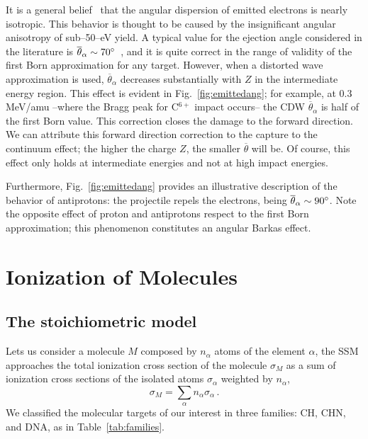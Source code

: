 \documentclass[10pt,showpacs,twocolumn]{revtex4}
\begin{document}
It is a general belief~\cite{Rudd1992} that the 
angular dispersion of emitted electrons is nearly isotropic. This 
behavior is thought to be caused by the insignificant angular anisotropy 
of sub--50--eV yield. 
A typical value for the ejection angle considered in the literature is 
$\overline{\theta}_{\alpha}\sim 70\degree$~\cite{surdutovic2018}, and 
it is quite correct in the range of validity of the first Born 
approximation for any target. However, when a distorted wave approximation 
is used, $\overline{\theta}_{\alpha}$ decreases substantially with $Z$ 
in the intermediate energy region. This effect is evident in 
Fig.~\ref{fig:emittedang};
for example, at 0.3 MeV/amu --where the Bragg peak for C$^{6+}$ impact 
occurs-- the CDW $\overline{\theta}_{\alpha}$ is half of the first Born 
value. This correction closes the damage to the forward direction.
We can attribute this forward direction correction to the capture to 
the continuum effect; the higher the charge $Z$, the smaller 
$\overline{\theta}$ will be. Of course, this effect only holds at 
intermediate energies and not at high impact energies. 

Furthermore, Fig.~\ref{fig:emittedang} provides an illustrative 
description of the behavior of antiprotons: the projectile repels the 
electrons, being $\overline{\theta}_{\alpha}\sim 90\degree$. Note the 
opposite effect of proton and antiprotons respect to the first Born 
approximation; this phenomenon constitutes an angular Barkas effect.


\section{Ionization of Molecules}
\label{sec:molecules}
\subsection{The stoichiometric model}
\label{subsec:stoichiometric}

Lets us consider a molecule $M$ composed by $n_{\alpha}$ atoms of the
element $\alpha$, the SSM approaches the total ionization cross section 
of the molecule $\sigma_{M}$ as a sum of ionization cross sections of 
the isolated atoms $\sigma_{\alpha}$ weighted by $n_{\alpha}$, 
\begin{equation}
 \sigma_{M}=\sum\limits_{\alpha}n_{\alpha}\sigma_{\alpha}\,.  
 \label{eq:sumion}
\end{equation}
We classified the molecular targets of our interest in three families: 
CH, CHN, and DNA, as in Table~\ref{tab:families}.
\end{document}
